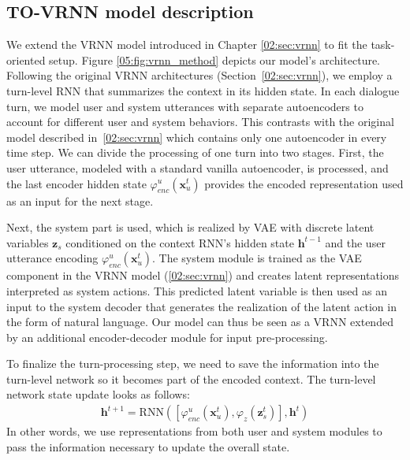 \subsection{TO-VRNN model description}
\label{05:sec:vrnn-model}
We extend the VRNN model introduced in Chapter \ref{02:sec:vrnn} to fit the task-oriented setup.
Figure \ref{05:fig:vrnn_method} depicts our model's architecture.
Following the original VRNN architectures (Section~\ref{02:sec:vrnn}), we employ a turn-level RNN that summarizes the context in its hidden state.
In each dialogue turn, we model user and system utterances with separate autoencoders to account for different user and system behaviors.
This contrasts with the original model described in~\ref{02:sec:vrnn} which contains only one autoencoder in every time step.
We can divide the processing of one turn into two stages.
First, the user utterance, modeled with a standard vanilla autoencoder, is processed, and the last encoder hidden state $\varphi^u_{enc}(\mathbf{x}^t_u)$ provides the encoded representation used as an input for the next stage.

Next, the system part is used, which is realized by VAE with discrete latent variables $\textbf{z}_s$ conditioned on the context RNN's hidden state $\mathbf{h}^{t-1}$ and the user utterance encoding $\varphi^u_{enc}(\mathbf{x}^t_u)$.
The system module is trained as the VAE component in the VRNN model (\ref{02:sec:vrnn}) and creates latent representations interpreted as system actions.
This predicted latent variable is then used as an input to the system decoder that generates the realization of the latent action in the form of natural language.
Our model can thus be seen as a VRNN extended by an additional encoder-decoder module for input pre-processing.

To finalize the turn-processing step, we need to save the information into the turn-level network so it becomes part of the encoded context.
The turn-level network state update looks as follows:
\begin{equation}
    \begin{gathered}
        \mathbf{h}^{t+1} = \text{RNN}([\varphi^u_{enc}(\mathbf{x}_u^t),\varphi_{z}(\mathbf{z}^t_s)], \mathbf{h}^t)
    \end{gathered}
\end{equation}
In other words, we use representations from both user and system modules to pass the information necessary to update the overall state.

